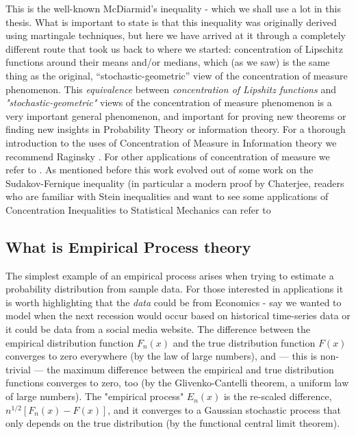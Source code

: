 \documentclass[12pt, oneside, a4paper]{article}
\theoremstyle{plain}
\theoremstyle{definition}
\begin{document}
This is the well-known McDiarmid’s inequality\cite{McDiarmid_tutorial} - which we shall use a lot in this thesis.
What is important to state is that this inequality was originally derived using martingale techniques, but here we have arrived at it through a 
completely different route that took us back to where we started: concentration of Lipschitz functions around their means and/or medians, which (as we 
saw) is the same thing as the original, “stochastic-geometric” view of the concentration of measure phenomenon.
This \textit{equivalence} between \textit{concentration of Lipshitz functions} and \textit{"stochastic-geometric"} views of the concentration
of measure phenomenon is a very important general phenomenon, and important for proving new theorems or finding new insights in Probability Theory
or information theory\cite{cover2006elements}. For a thorough introduction to the uses of Concentration of Measure in Information theory we recommend
Raginsky \cite{Raginsky_ConcMeasure}. For other applications of concentration of measure we refer to \cite{boucheron2013concentration,
Ledoux_lecture_notes, Lugosi, SLT_Lugosi_Bocheron}. 
As mentioned before this work evolved out of some work on the Sudakov-Fernique inequality (in particular
a modern proof by Chaterjee\cite{Chatterjee2005}, readers who are familiar with
Stein inequalities and want to see some applications of Concentration Inequalities to Statistical Mechanics can refer to 
\cite{2009arXiv0906.1034C}
\subsection{What is Empirical Process theory}\label{sec:SLT}
The simplest example of an empirical process arises when trying to estimate a probability distribution from sample data. 
For those interested in applications it is worth highlighting that the \textit{data} could be from Economics - say we wanted to model when the next
recession would occur based on historical time-series data \cite{McDonald_TimeSeries} or it could be data from a 
social media website.
The difference between the empirical distribution function $F_n(x)$ and the true distribution function $F(x)$ converges to zero everywhere (by the law 
of large numbers), and — this is non- trivial — the maximum difference between the empirical and true distribution functions converges to zero, too (by 
the Glivenko-Cantelli theorem, a uniform law of large numbers). The "empirical process" $E_n(x)$ is the re-scaled difference, 
$n^{1/2}[F_{n}(x)−F(x)]$, and it converges to a Gaussian stochastic process that only depends on the true distribution (by the functional central limit 
theorem). 
\end{document}
